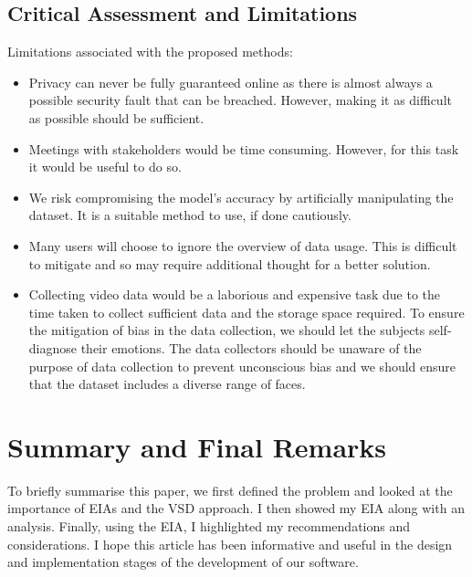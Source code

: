 \documentclass[10pt,journal,compsoc]{IEEEtran}
\begin{document}
\subsection{Critical Assessment and Limitations}
Limitations associated with the proposed methods:
\begin{itemize}
    \item 	Privacy can never be fully guaranteed online as there is almost always a possible security fault that can be breached.  However, making it as difficult as possible should be sufficient. 
    \item 	Meetings with stakeholders would be time consuming. However, for this task it would be useful to do so.
    \item 	We risk compromising the model’s accuracy by artificially manipulating the dataset. It is a suitable method to use, if done cautiously.
    \item 	Many users will choose to ignore the overview of data usage. This is difficult to mitigate and so may require additional thought for a better solution.
    \item 	Collecting video data would be a laborious and expensive task due to the time taken to collect sufficient data and the storage space required. To ensure the mitigation of bias in the data collection, we should let the subjects self-diagnose their emotions. The data collectors should be unaware of the purpose of data collection to prevent unconscious bias and we should ensure that the dataset includes a diverse range of faces.
\end{itemize}



\section{Summary and Final Remarks}
To briefly summarise this paper, we first defined the problem and looked at the importance of EIAs and the VSD approach. I then showed my EIA along with an analysis. Finally, using the EIA, I highlighted my recommendations and considerations. I hope this article has been informative and useful in the design and implementation stages of the development of our software.



\end{document}
